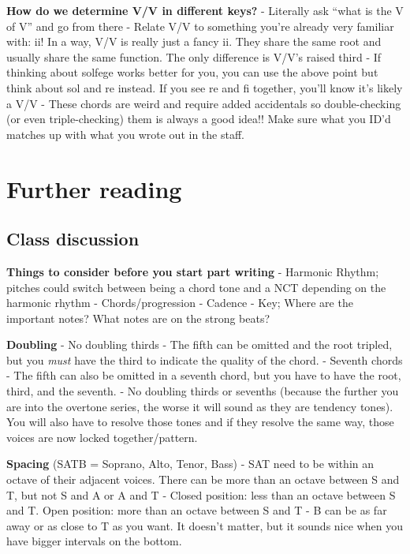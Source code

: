 \documentclass{book}
\begin{document}
\textbf{How do we determine V/V in different keys?} - Literally ask ``what is
the V of V'' and go from there - Relate V/V to something you're already very
familiar with: ii! In a way, V/V is really just a fancy ii. They share the
same root and usually share the same function. The only difference is V/V's
raised third - If thinking about solfege works better for you, you can use the
above point but think about sol and re instead. If you see re and fi together,
you'll know it's likely a V/V - These chords are weird and require added
accidentals so double-checking (or even triple-checking) them is always a good
idea!! Make sure what you ID'd matches up with what you wrote out in the
staff.

\hypertarget{further-reading-11}{%
\chapter{Further reading}\label{further-reading-11}}

\hypertarget{class-discussion-24}{%
\section{Class discussion}\label{class-discussion-24}}

\textbf{Things to consider before you start part writing} - Harmonic Rhythm;
pitches could switch between being a chord tone and a NCT depending on the
harmonic rhythm - Chords/progression - Cadence - Key; Where are the important
notes? What notes are on the strong beats?

\textbf{Doubling} - No doubling thirds - The fifth can be omitted and the root
tripled, but you \emph{must} have the third to indicate the quality of the
chord. - Seventh chords - The fifth can also be omitted in a seventh chord,
but you have to have the root, third, and the seventh. - No doubling thirds or
sevenths (because the further you are into the overtone series, the worse it
will sound as they are tendency tones). You will also have to resolve those
tones and if they resolve the same way, those voices are now locked
together/pattern.

\textbf{Spacing} (SATB = Soprano, Alto, Tenor, Bass) - SAT need to be within
an octave of their adjacent voices. There can be more than an octave between S
and T, but not S and A or A and T - Closed position: less than an octave
between S and T. Open position: more than an octave between S and T - B can be
as far away or as close to T as you want. It doesn't matter, but it sounds
nice when you have bigger intervals on the bottom.
\end{document}
